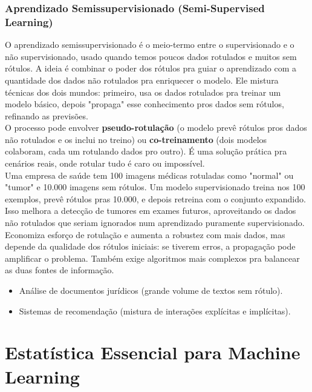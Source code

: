 \documentclass[a4paper,12pt,openany]{book}
\begin{document}
\subsection{Aprendizado Semissupervisionado (Semi-Supervised Learning)}
O aprendizado semissupervisionado é o meio-termo entre o supervisionado e o não supervisionado, usado quando temos poucos dados rotulados e muitos sem rótulos. A ideia é combinar o poder dos rótulos pra guiar o aprendizado com a quantidade dos dados não rotulados pra enriquecer o modelo. Ele mistura técnicas dos dois mundos: primeiro, usa os dados rotulados pra treinar um modelo básico, depois "propaga" esse conhecimento pros dados sem rótulos, refinando as previsões.\\
O processo pode envolver \textbf{pseudo-rotulação} (o modelo prevê rótulos pros dados não rotulados e os inclui no treino) ou \textbf{co-treinamento} (dois modelos colaboram, cada um rotulando dados pro outro). É uma solução prática pra cenários reais, onde rotular tudo é caro ou impossível.\\
Uma empresa de saúde tem 100 imagens médicas rotuladas como "normal" ou "tumor" e 10.000 imagens sem rótulos. Um modelo supervisionado treina nos 100 exemplos, prevê rótulos pras 10.000, e depois retreina com o conjunto expandido. Isso melhora a detecção de tumores em exames futuros, aproveitando os dados não rotulados que seriam ignorados num aprendizado puramente supervisionado.\\
Economiza esforço de rotulação e aumenta a robustez com mais dados, mas depende da qualidade dos rótulos iniciais: se tiverem erros, a propagação pode amplificar o problema. Também exige algoritmos mais complexos pra balancear as duas fontes de informação.
\begin{itemize}
    \item Análise de documentos jurídicos (grande volume de textos sem rótulo).
    \item Sistemas de recomendação (mistura de interações explícitas e implícitas).
\end{itemize}

\newpage

\chapter{Estatística Essencial para Machine Learning}\label{cap:estatistica}
\end{document}
